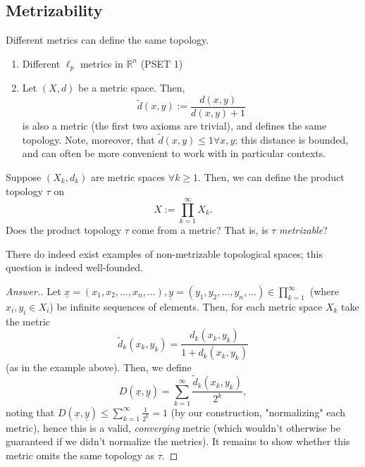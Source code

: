 \subsection{Metrizability}

\begin{proposition}
    Different metrics can define the same topology.
\end{proposition}
\begin{example}
    \begin{enumerate}
        \item Different $\ell_p$ metrics in $\mathbb{R}^n$ (PSET 1)
        \item Let $(X, d)$ be a metric space. Then, \[
        \tilde{d}(x,y) := \frac{d(x,y)}{d(x,y)+1}
        \]
        is also a metric (the first two axioms are trivial), and defines the same topology. Note, moreover, that $\tilde{d}(x,y) \leq 1 \forall x, y$; this distance is bounded, and can often be more convenient to work with in particular contexts.
    \end{enumerate}
\end{example}

\begin{question}
    Suppose $(X_k, d_k)$ are metric spaces $\forall k \geq 1$. Then, we can define the product topology $\tau$ on  \[
        X := \prod_{k=1}^{\infty} X_k.    
        \]
        Does the product topology $\tau$ come from a metric? That is, is $\tau$ \emph{metrizable}?
\end{question}

\begin{remark}
    There do indeed exist examples of non-metrizable topological spaces; this question is indeed well-founded.
\end{remark}

\begin{proof}[Answer.]
    Let $\underline{x}=(x_1, x_2, \dots, x_n, \dots), \underline{y}=(y_1, y_2, \dots, y_n, \dots) \in \prod_{k=1}^\infty$ (where $x_i, y_i \in X_i$) be infinite sequences of elements. Then, for each metric space $X_k$ take the metric $$\tilde{d}_k(x_k, y_k) = \frac{d_k(x_k,y_k)}{1+d_k(x_k,y_k)}$$ (as in the example above). Then, we define \[
    D(\underline{x}, \underline{y}) = \sum_{k=1}^{\infty} \frac{\tilde{d}_k(x_k, y_k)}{2^k},
    \]
    noting that $D(\underline{x}, \underline{y}) \leq \sum_{k=1}^\infty \frac{1}{2^k} = 1$ (by our construction, "normalizing" each metric), hence this is a valid, \emph{converging} metric (which wouldn't otherwise be guaranteed if we didn't normalize the metrics). It remains to show whether this metric omits the same topology as $\tau$. 
\end{proof}

